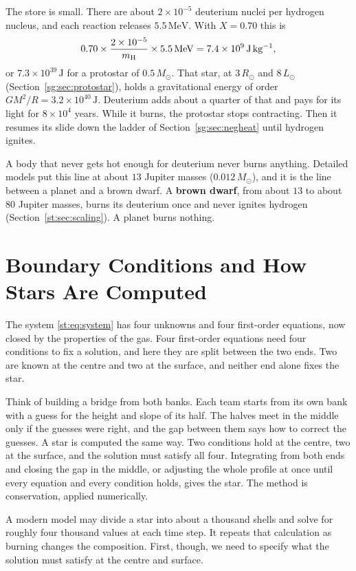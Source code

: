 The store is small. There are about $2\times10^{-5}$ deuterium nuclei per hydrogen nucleus, and each reaction releases $5.5\,\mathrm{MeV}$. With $X=0.70$ this is
\[
0.70\times\frac{2\times10^{-5}}{m_{\rm H}}\times5.5\,\mathrm{MeV}=7.4\times10^9\,\mathrm{J\,kg^{-1}},
\]
or $7.3\times10^{39}\,\mathrm J$ for a protostar of $0.5\,M_\odot$. That star, at $3\,R_\odot$ and $8\,L_\odot$ (Section~\ref{sg:sec:protostar}), holds a gravitational energy of order $GM^2/R=3.2\times10^{40}\,\mathrm J$. Deuterium adds about a quarter of that and pays for its light for $8\times10^4$ years. While it burns, the protostar stops contracting. Then it resumes its slide down the ladder of Section~\ref{sg:sec:negheat} until hydrogen ignites.

A body that never gets hot enough for deuterium never burns anything. Detailed models put this line at about $13$ Jupiter masses ($0.012\,M_\odot$), and it is the line between a planet and a brown dwarf. A \textbf{brown dwarf}, from about $13$ to about $80$ Jupiter masses, burns its deuterium once and never ignites hydrogen (Section~\ref{st:sec:scaling}). A planet burns nothing.

\section{Boundary Conditions and How Stars Are Computed}
\label{st:sec:computing}

The system \eqref{st:eq:system} has four unknowns and four first-order equations, now closed by the properties of the gas. Four first-order equations need four conditions to fix a solution, and here they are split between the two ends. Two are known at the centre and two at the surface, and neither end alone fixes the star.

Think of building a bridge from both banks. Each team starts from its own bank with a guess for the height and slope of its half. The halves meet in the middle only if the guesses were right, and the gap between them says how to correct the guesses. A star is computed the same way. Two conditions hold at the centre, two at the surface, and the solution must satisfy all four. Integrating from both ends and closing the gap in the middle, or adjusting the whole profile at once until every equation and every condition holds, gives the star. The method is conservation, applied numerically.

A modern model may divide a star into about a thousand shells and solve for roughly four thousand values at each time step. It repeats that calculation as burning changes the composition. First, though, we need to specify what the solution must satisfy at the centre and surface.

